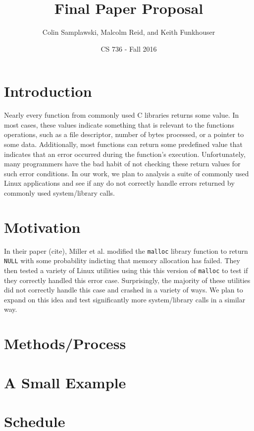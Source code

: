 \documentclass[10pt]{article}
\title{Final Paper Proposal}
\author{Colin Samplawski, Malcolm Reid, and Keith Funkhouser}
\date{CS 736 - Fall 2016}
\begin{document}
\maketitle
\setlength{\baselineskip}{18pt}
\section{Introduction}
Nearly every function from commonly used C libraries returns some value. In most cases, these values indicate something that is relevant to the  functions operations, such as a file descriptor, number of bytes processed, or a pointer to some data. Additionally, most functions can return some predefined value that indicates that an error occurred during the function's execution. Unfortunately, many programmers have the bad habit of not checking these return values for such error conditions. In our work, we plan to analysis a suite of commonly used Linux applications and see if any do not correctly handle errors returned by commonly used system/library calls.

\section{Motivation}
In their paper (cite), Miller et al. modified the \texttt{malloc} library function to return \texttt{NULL} with some probability indicting that memory allocation has failed. They then tested a variety of Linux utilities using this this version of \texttt{malloc} to test if they correctly handled this error case. Surprisingly, the majority of these utilities did not correctly handle this case and crashed in a variety of ways. We plan to expand on this idea and test significantly more system/library calls in a similar way.

\section{Methods/Process}

\section{A Small Example}

\section{Schedule}
\end{document}

